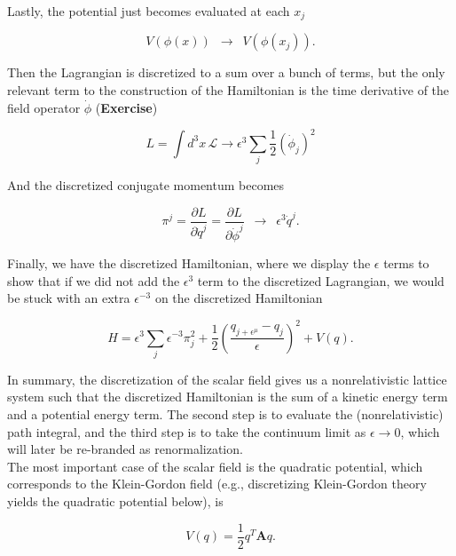 \noindent Lastly, the potential just becomes evaluated at each $x_j$

\begin{equation}
V(\phi(x)) \,\,\, \rightarrow \,\,\, V(\phi(x_j)).
\end{equation}

\noindent Then the Lagrangian is discretized to a sum over a bunch of terms, but the only relevant term to the construction of the Hamiltonian is the time derivative of the field operator $\dot{\phi}$ (\textbf{Exercise})

\begin{equation}
L = \int d^3 x \, \mathcal{L} \rightarrow \epsilon^3 \sum_j \frac{1}{2} (\dot{\phi}_j)^2
\end{equation}

\noindent And the discretized conjugate momentum becomes

\begin{equation}
\pi^j = \frac{\partial L}{\partial \dot{q}^j} = \frac{\partial L}{\partial \dot{\phi}^j}  \,\,\, \rightarrow \,\,\, \epsilon^3 \dot{q}^j .
\end{equation}

\noindent Finally, we have the discretized Hamiltonian, where we display the $\epsilon$ terms to show that if we did not add the $\epsilon^3$ term to the discretized Lagrangian, we would be stuck with an extra $\epsilon^{-3}$ on the discretized Hamiltonian

\begin{equation}
H = \epsilon^3 \sum_j \epsilon^{-3} \pi_j^2 + \frac{1}{2} \left( \frac{q_{j+\epsilon^\mu}-q_j}{\epsilon} \right)^2 + V(q).
\end{equation}

\noindent In summary, the discretization of the scalar field gives us a nonrelativistic lattice system such that the discretized Hamiltonian is the sum of a kinetic energy term and a potential energy term. The second step is to evaluate the (nonrelativistic) path integral, and the third step is to take the continuum limit as $\epsilon \rightarrow 0$, which will later be re-branded as renormalization. \\

\noindent The most important case of the scalar field is the quadratic potential, which corresponds to the Klein-Gordon field (e.g., discretizing Klein-Gordon theory yields the quadratic potential below), is

\begin{equation}
V(q) = \frac{1}{2} q^T \textbf{A} q.
\end{equation}


